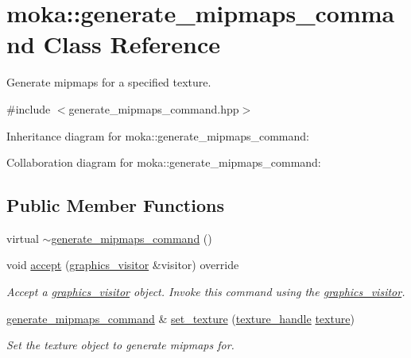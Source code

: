 \hypertarget{classmoka_1_1generate__mipmaps__command}{}\section{moka\+::generate\+\_\+mipmaps\+\_\+command Class Reference}
\label{classmoka_1_1generate__mipmaps__command}


Generate mipmaps for a specified texture.  




{\ttfamily \#include $<$generate\+\_\+mipmaps\+\_\+command.\+hpp$>$}



Inheritance diagram for moka\+::generate\+\_\+mipmaps\+\_\+command\+:


Collaboration diagram for moka\+::generate\+\_\+mipmaps\+\_\+command\+:
\subsection*{Public Member Functions}
\begin{DoxyCompactItemize}
\item 
virtual \mbox{\hyperlink{classmoka_1_1generate__mipmaps__command_ac8755ed629caa3c80dbe3e5069cf6279}{$\sim$generate\+\_\+mipmaps\+\_\+command}} ()
\item 
void \mbox{\hyperlink{classmoka_1_1generate__mipmaps__command_af04e36f3f51d7ba505c3f157ceefb42c}{accept}} (\mbox{\hyperlink{classmoka_1_1graphics__visitor}{graphics\+\_\+visitor}} \&visitor) override
\begin{DoxyCompactList}\small\item\em Accept a \mbox{\hyperlink{classmoka_1_1graphics__visitor}{graphics\+\_\+visitor}} object. Invoke this command using the \mbox{\hyperlink{classmoka_1_1graphics__visitor}{graphics\+\_\+visitor}}. \end{DoxyCompactList}\item 
\mbox{\hyperlink{classmoka_1_1generate__mipmaps__command}{generate\+\_\+mipmaps\+\_\+command}} \& \mbox{\hyperlink{classmoka_1_1generate__mipmaps__command_add1aa61412ba9424f727f5a536e5be06}{set\+\_\+texture}} (\mbox{\hyperlink{structmoka_1_1texture__handle}{texture\+\_\+handle}} \mbox{\hyperlink{classmoka_1_1generate__mipmaps__command_aef2a378b2152cf24609a979a0673358a}{texture}})
\begin{DoxyCompactList}\small\item\em Set the texture object to generate mipmaps for. \end{DoxyCompactList}\end{DoxyCompactItemize}
